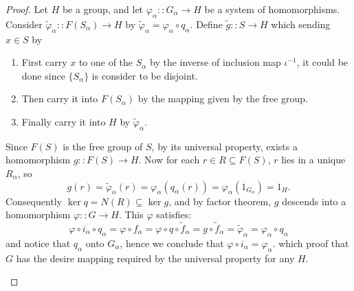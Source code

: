 \documentclass[a4paper]{article}
\theoremstyle{remark}
\theoremstyle{definition}
\theoremstyle{definition}
\theoremstyle{plain}
\begin{document}
\begin{proof}
    Let $H$ be a group, and let $\varphi_\alpha :: G_\alpha \to H$ be a system of homomorphisms.
    Consider $\tilde{\varphi}_\alpha :: F(S_\alpha) \to H$ by $\tilde{\varphi}_\alpha = \varphi_\alpha \circ q_\alpha$.
    Define $\tilde{g} :: S \to H$ which sending $x \in S$ by
    \begin{enumerate}
      \item First carry $x$ to one of the $S_\alpha$ by the inverse of inclusion map $\iota^{-1}$, 
        it could be done since $\{S_\alpha\}$ is consider to be disjoint.
      \item Then carry it into $F(S_\alpha)$ by the mapping given by the free group.
      \item Finally carry it into $H$ by $\tilde{\varphi}_\alpha$.
    \end{enumerate}
    Since $F(S)$ is the free group of $S$, by its universal property, exists a homomorphism $g :: F(S) \to H$.
    Now for each $r \in R \subseteq F(S)$, $r$ lies in a unique $R_\alpha$, so
    \[ g(r) = \tilde{\varphi}_\alpha(r) = \varphi_\alpha(q_\alpha(r)) = \varphi_\alpha(1_{G_\alpha}) = 1_H. \]
    Consequently $\ker q = N(R) \subseteq \ker g$, and by factor theorem, $g$ descends into a
    homomorphism $\varphi :: G \to H$. This $\varphi$ satisfies:
    \[
      \varphi \circ i_\alpha \circ q_\alpha = \varphi \circ f_\alpha
      = \varphi \circ q \circ \tilde{f}_\alpha
      = g \circ \tilde{f}_\alpha
      = \tilde{\varphi}_\alpha
      = \varphi_\alpha \circ q_\alpha
    \]
    and notice that $q_\alpha$ onto $G_\alpha$, hence we conclude that $\varphi \circ i_\alpha = \varphi_\alpha$.
    which proof that $G$ has the desire mapping required by the universal property for any $H$.
    \begin{figure}[h]
      \centering
\end{figure}
\end{proof}
\end{document}
